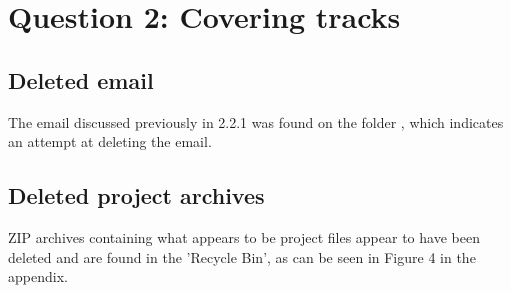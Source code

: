 \section{Question 2: Covering tracks} %

\subsection{Deleted email} %
\label{sub:deleted_email}
\begin{myenum}
    \item The email discussed previously in 2.2.1 was found on the folder , which indicates an attempt at deleting the email.
\end{myenum}

\subsection{Deleted project archives} %
\label{sub:deleted_project_archives}

\begin{myenum}
    \item ZIP archives containing what appears to be project files appear to have been deleted and are found in the 'Recycle Bin', as can be seen in Figure 4 in the appendix.
\end{myenum}

